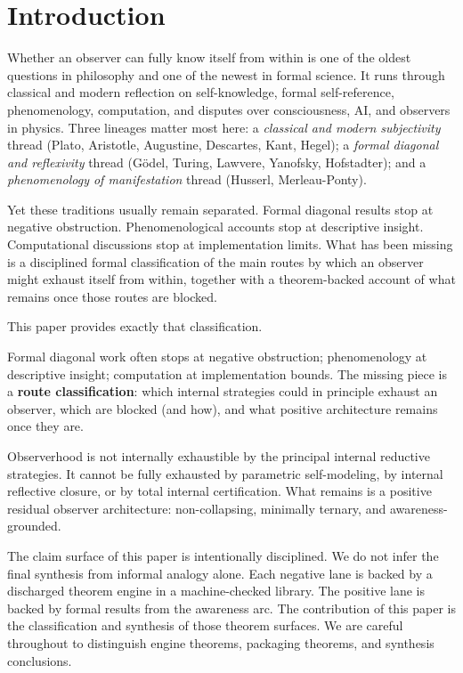 \documentclass[11pt]{article}
\theoremstyle{plain}
\theoremstyle{definition}
\theoremstyle{remark}
\begin{document}
\section{Introduction}
\label{sec:intro}

Whether an observer can fully know itself from within is one of the oldest
questions in philosophy and one of the newest in formal science.  It runs
through classical and modern reflection on self-knowledge, formal
self-reference, phenomenology, computation, and disputes over
consciousness, AI, and observers in physics.  Three lineages matter most
here: a \emph{classical and modern subjectivity} thread (Plato, Aristotle,
Augustine, Descartes, Kant, Hegel); a \emph{formal diagonal and reflexivity}
thread (G\"odel, Turing, Lawvere, Yanofsky, Hofstadter); and a
\emph{phenomenology of manifestation} thread (Husserl, Merleau-Ponty).

Yet these traditions usually remain separated.  Formal diagonal results
stop at negative obstruction.  Phenomenological accounts stop at
descriptive insight.  Computational discussions stop at implementation
limits.  What has been missing is a disciplined formal classification of
the main routes by which an observer might exhaust itself from within,
together with a theorem-backed account of what remains once those routes
are blocked.

This paper provides exactly that classification.

\begin{keybox}[title={The structural gap this paper fills}]
Formal diagonal work often stops at negative obstruction; phenomenology at
descriptive insight; computation at implementation bounds.  The missing
piece is a \textbf{route classification}: which internal strategies could
in principle exhaust an observer, which are blocked (and how), and what
positive architecture remains once they are.
\end{keybox}

\begin{keybox}[title={Central thesis}]
Observerhood is not internally exhaustible by the principal internal
reductive strategies.  It cannot be fully exhausted by parametric
self-modeling, by internal reflective closure, or by total internal
certification.  What remains is a positive residual observer architecture:
non-collapsing, minimally ternary, and awareness-grounded.
\end{keybox}

The claim surface of this paper is intentionally disciplined.  We do not
infer the final synthesis from informal analogy alone.  Each negative lane
is backed by a discharged theorem engine in a machine-checked library.
The positive lane is backed by formal results from the awareness arc.
The contribution of this paper is the classification and synthesis of
those theorem surfaces.  We are careful throughout to distinguish engine
theorems, packaging theorems, and synthesis conclusions.
\end{document}

